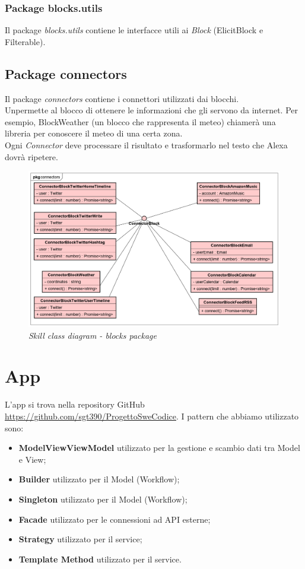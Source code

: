\subsubsection{Package blocks.utils}
Il package \textit{blocks.utils} contiene le interfacce utili ai \textit{Block} (ElicitBlock e Filterable).
\subsection{Package connectors}
Il package \textit{connectors} contiene i connettori utilizzati dai blocchi.\\
Unpermette al blocco di ottenere le informazioni che gli servono da internet. Per esempio, BlockWeather (un blocco che rappresenta il meteo) chiamerà una libreria per conoscere il meteo di una certa zona.\\
Ogni \textit{Connector} deve processare il risultato e trasformarlo nel testo che Alexa dovrà ripetere.
\begin{figure} [H]
    \centering
	\includegraphics[scale=0.3]{./images/ZeroSevenClassConnectors.png}
	\caption{\textit{Skill class diagram - blocks package}}\label{classlambda}
\end{figure}

\newpage
\section{App}\label{architetturaApp}

L'app si trova nella repository GitHub \url{https://github.com/sgt390/ProgettoSweCodice}.
I pattern che abbiamo utilizzato sono:
\begin{itemize}
	\item \textbf{ModelViewViewModel} utilizzato per la gestione e scambio dati tra Model e View;
	\item \textbf{Builder} utilizzato per il Model (Workflow);
	\item \textbf{Singleton} utilizzato per il Model (Workflow);
	\item \textbf{Facade} utilizzato per le connessioni ad API esterne;
	\item \textbf{Strategy} utilizzato per il service;
	\item \textbf{Template Method} utilizzato per il service.
\end{itemize}
\clearpage

